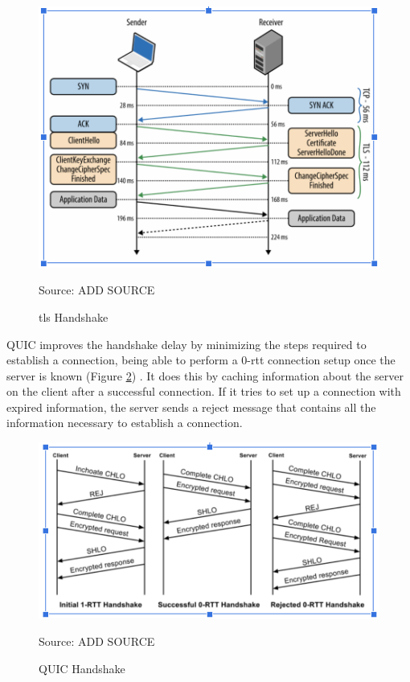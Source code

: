 \begin{figure}[ht]
    \centering
    \includegraphics[width=\linewidth]{figures/tls_handshake.png}
    \caption{\gls{tls} Handshake}
    {Source: ADD SOURCE}
    \label{figure:tcp_v_tls_v_quic_handshake}
\end{figure}

QUIC improves the handshake delay by minimizing the steps required to establish a connection, being able to perform a 0-\gls{rtt} connection setup once the server is known (Figure \ref{figure:quic_handshake}) \cite{quic_protocol, rfc9000}. It does this by caching information about the server on the client after a successful connection. If it tries to set up a connection with expired information, the server sends a reject message that contains all the information necessary to establish a connection.

\begin{figure}[ht]
    \centering
    \includegraphics[width=\linewidth]{figures/quic_handshake.png}
    \caption{QUIC Handshake}
    {Source: ADD SOURCE}
    \label{figure:quic_handshake}
\end{figure}

